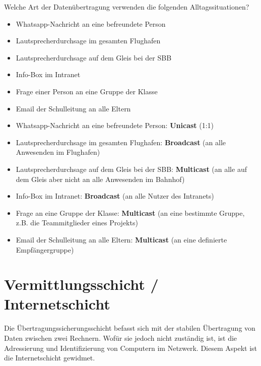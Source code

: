 \begin{myexercise}
	Welche Art der Datenübertragung verwenden die folgenden Alltagssituationen?
	\begin{itemize}
		\item Whatsapp-Nachricht an eine befreundete Person
		\item Lautsprecherdurchsage im gesamten Flughafen
		\item Lautsprecherdurchsage auf dem Gleis bei der SBB
		\item Info-Box im Intranet
		\item Frage einer Person an eine Gruppe der Klasse
		\item Email der Schulleitung an alle Eltern
	\end{itemize}
	\begin{myanswer}
		\begin{itemize}
			\item Whatsapp-Nachricht an eine befreundete Person: \textbf{Unicast} (1:1)
			\item Lautsprecherdurchsage im gesamten Flughafen: \textbf{Broadcast} (an alle Anwesenden im Flughafen)
			\item Lautsprecherdurchsage auf dem Gleis bei der SBB: \textbf{Multicast} (an alle auf dem Gleis aber nicht an alle Anwesenden im Bahnhof)
			\item Info-Box im Intranet: \textbf{Broadcast} (an alle Nutzer des Intranets)
			\item Frage an eine Gruppe der Klasse: \textbf{Multicast} (an eine bestimmte Gruppe, z.B. die Teammitglieder eines Projekts)
			\item Email der Schulleitung an alle Eltern: \textbf{Multicast} (an eine definierte Empfängergruppe)
		\end{itemize}
	\end{myanswer}
\end{myexercise}


\section{\texorpdfstring{\textcolor{\networkLayerColor}{Vermittlungsschicht / Internetschicht}}{Vermittlungsschicht / Internetschicht}}
Die Übertragungssicherungsschicht befasst sich mit der stabilen Übertragung von Daten zwischen zwei Rechnern. Wofür sie jedoch nicht zuständig ist, ist die Adressierung und Identifizierung von Computern im Netzwerk. Diesem Aspekt ist die Internetschicht gewidmet.

